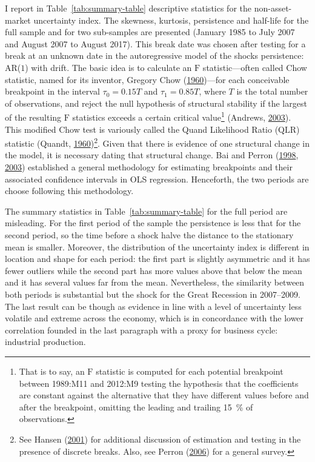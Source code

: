 \documentclass[12pt,twoside]{reedthesis}
\begin{document}
I report in Table~\ref{tab:summary-table} descriptive statistics for the non-asset-market uncertainty index. The skewness, kurtosis, persistence and half-life for the full sample and for two sub-samples are presented (January 1985 to July 2007 and August 2007 to August 2017). This break date was chosen after testing for a break at an unknown date in the autoregressive model of the shocks persistence: AR(\(1\)) with drift. The basic idea is to calculate an \(\ensuremath{\mathrm{F}}\) statistic---often called Chow statistic, named for its inventor, Gregory Chow (\protect\hyperlink{ref-chow:1960}{1960})---for each conceivable breakpoint in the interval \(\tau_{0} = 0.15T\) and \(\tau_{1} = 0.85T\), where \(T\) is the total number of observations, and reject the null hypothesis of structural stability if the largest of the resulting \(\ensuremath{\mathrm{F}}\) statistics exceeds a certain critical value\footnote{That is to say, an \(\ensuremath{\mathrm{F}}\) statistic is computed for each potential breakpoint between 1989:M11 and 2012:M9 testing the hypothesis that the coefficients are constant against the alternative that they have different values before and after the breakpoint, omitting the leading and trailing 15~\% of observations.} (Andrews, \protect\hyperlink{ref-andrews:2003}{2003}). This modified Chow test is variously called the Quand Likelihood Ratio (\(\ensuremath{\mathrm{QLR}}\)) statistic (Quandt, \protect\hyperlink{ref-quandt:1960}{1960})\footnote{See Hansen (\protect\hyperlink{ref-hansen:2001}{2001}) for additional discussion of estimation and testing in the presence of discrete breaks. Also, see Perron (\protect\hyperlink{ref-perron:2006}{2006}) for a general survey.}. Given that there is evidence of one structural change in the model, it is necessary dating that structural change. Bai and Perron (\protect\hyperlink{ref-baiperr:1998}{1998}, \protect\hyperlink{ref-baiperr:2003}{2003}) established a general methodology for estimating breakpoints and their associated confidence intervals in OLS regression. Henceforth, the two periods are choose following this methodology.

The summary statistics in Table~\ref{tab:summary-table} for the full period are misleading. For the first period of the sample the persistence is less that for the second period, so the time before a shock halve the distance to the stationary mean is smaller. Moreover, the distribution of the uncertainty index is different in location and shape for each period: the first part is slightly asymmetric and it has fewer outliers while the second part has more values above that below the mean and it has several values far from the mean. Nevertheless, the similarity between both periods is substantial but the shock for the Great Recession in 2007--2009. The last result can be though as evidence in line with a level of uncertainty less volatile and extreme across the economy, which is in concordance with the lower correlation founded in the last paragraph with a proxy for business cycle: industrial production.
\end{document}
